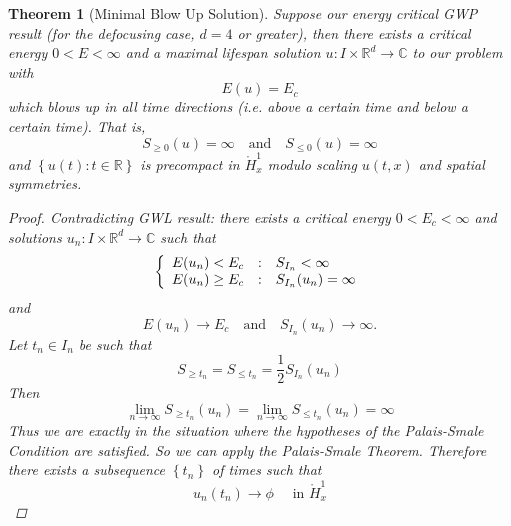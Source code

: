 \documentclass{article}
\newtheorem{theorem}{Theorem}
\def\R{\mathbb{R}} %
\begin{document}
\begin{theorem}[Minimal Blow Up Solution]
  \label{thm:minimal-blow-up-solution}
  Suppose our energy critical GWP result (for the defocusing case, $d=4$ or
  greater), then there exists a critical energy $0<E<\infty$ and a maximal
  lifespan solution $u: I\times \R^d \to \mathbb{C}$ to our problem with
  \begin{equation*}
    E(u) = E_{c}
  \end{equation*}
  which blows up in all time directions (i.e. above a certain time and below a
  certain time). That is,
  \begin{equation*}
    S_{ \geq 0}(u) = \infty
    \quad \text{and} \quad
    S_{ \leq 0}(u) = \infty
  \end{equation*}
  and $\left\{u(t) : t\in \R\right\}$ is precompact in $\mathring{H}_{x}^{1}$
  modulo scaling $u(t,x)$ and spatial symmetries.
  \begin{proof}
    Contradicting GWL result: there exists a critical energy $0<E_{c}<\infty$
    and solutions $u_{n}: I \times \R^d \to \mathbb{C}$ such that
    \begin{equation*}
      \left\{ \begin{array}{l@{\quad:\quad}l}
          E(u_{n})<E_{c} & S_{I_{n}}<\infty\\
          E(u_{n}) \geq E_{c}& S_{I_{n}}(u_{n}) = \infty
        \end{array}\right.
    \end{equation*}
    and
    \begin{equation*}
      E(u_{n}) \to E_{c} \quad \text{and} \quad S_{I_{n}}(u_{n}) \to \infty.
    \end{equation*}
    Let $t_{n}\in I_{n}$ be such that
    \begin{equation*}
      S_{ \geq t_{n}}= S_{ \leq t_{n}}= \frac{1}{2}S_{I_{n}}(u_{n}) 
    \end{equation*}
    Then
    \begin{equation}\label{eq:17}
      \lim_{n\to\infty} S_{ \geq t_{n}}(u_{n}) = \lim_{n\to\infty} S_{ \leq
        t_{n}}(u_{n}) = \infty
    \end{equation}
    Thus we are exactly in the situation where the hypotheses of the
    Palais-Smale Condition are satisfied. So we can apply the Palais-Smale
    Theorem. Therefore there exists a subsequence $\left\{t_{n}\right\}$ of
    times such that
    \begin{equation*}
      u_{n}(t_{n}) \to \phi \quad \text{ in } \mathring{H}_{x}^{1}
    \end{equation*}

\end{proof}
\end{theorem}
\end{document}
